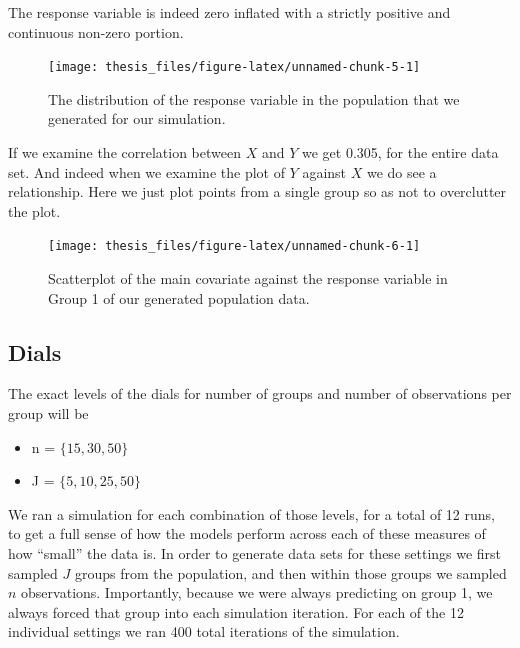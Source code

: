 \documentclass[12pt,twoside]{reedthesis}
\providecommand{\tightlist}{%
  \setlength{\itemsep}{0pt}\setlength{\parskip}{0pt}}
\begin{document}
The response variable is indeed zero inflated with a strictly positive and continuous non-zero portion.
\begin{figure}

{\centering \texttt{[image: thesis\_files/figure-latex/unnamed-chunk-5-1]} 

}

\caption{The distribution of the response variable in the population that we generated for our simulation.}\label{fig:unnamed-chunk-5}
\end{figure}
If we examine the correlation between \(X\) and \(Y\) we get 0.305, for the entire data set. And indeed when we examine the plot of \(Y\) against \(X\) we do see a relationship. Here we just plot points from a single group so as not to overclutter the plot.
\begin{figure}

{\centering \texttt{[image: thesis\_files/figure-latex/unnamed-chunk-6-1]} 

}

\caption{Scatterplot of the main covariate against the response variable in Group 1 of our generated population data.}\label{fig:unnamed-chunk-6}
\end{figure}
\hypertarget{dials}{%
\subsection{Dials}\label{dials}}

The exact levels of the dials for number of groups and number of observations per group will be
\begin{itemize}
\tightlist
\item
  n = \(\{15, 30, 50\}\)
\item
  J = \(\{5, 10, 25, 50\}\)
\end{itemize}
We ran a simulation for each combination of those levels, for a total of 12 runs, to get a full sense of how the models perform across each of these measures of how ``small'' the data is. In order to generate data sets for these settings we first sampled \(J\) groups from the population, and then within those groups we sampled \(n\) observations. Importantly, because we were always predicting on group 1, we always forced that group into each simulation iteration. For each of the 12 individual settings we ran 400 total iterations of the simulation.
\end{document}
